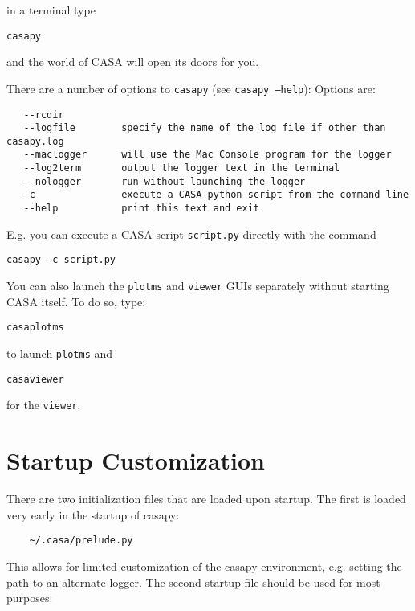 in a terminal type\\
\small
\begin{verbatim}
casapy
\end{verbatim}
\normalsize

and the world of CASA will open its doors for you. 

There are a number of options to {\tt casapy} (see {\tt casapy --help}):
Options are: 
\small
\begin{verbatim}
   --rcdir            
   --logfile        specify the name of the log file if other than casapy.log
   --maclogger      will use the Mac Console program for the logger
   --log2term       output the logger text in the terminal
   --nologger       run without launching the logger
   -c               execute a CASA python script from the command line 
   --help           print this text and exit
\end{verbatim}
\normalsize

E.g. you can execute a CASA script {\tt script.py} directly with the command
\small
\begin{verbatim}
casapy -c script.py
\end{verbatim}
\normalsize


You can also launch the {\tt plotms} and {\tt viewer} GUIs separately
without starting CASA itself. To do so, type:

\small
\begin{verbatim}
casaplotms
\end{verbatim}
\normalsize
to launch {\tt plotms} and 
\small
\begin{verbatim}
casaviewer
\end{verbatim}
\normalsize
for the {\tt viewer}.




\section{Startup Customization}
\label{section:install.customization}

There are two initialization files that are loaded upon startup. The
first is loaded very early in the startup of casapy:

\small
\begin{verbatim}
	~/.casa/prelude.py
\end{verbatim}
\normalsize

This allows for limited customization of the casapy environment,
e.g. setting the path to an alternate logger. The second startup file
should be used for most purposes:


